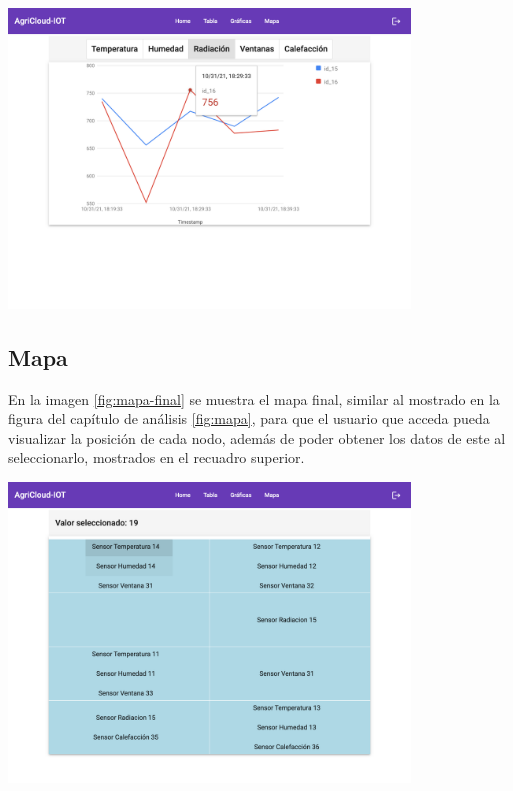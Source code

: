 \begin{center}
    \centering
    \includegraphics[width=0.8\textwidth]{img/06-Web-charts.png}
    \label{fig:graphs-final}
\end{center}


\subsection{Mapa}

En la imagen \ref{fig:mapa-final} se muestra el mapa final, similar al mostrado en la figura del capítulo de análisis \ref{fig:mapa}, para que el usuario que acceda pueda visualizar la posición de cada nodo, además de poder obtener los datos de este al seleccionarlo, mostrados en el recuadro superior.

\begin{center}
    \centering
    \includegraphics[width=0.8\textwidth]{img/06-Web-map.png}
    \label{fig:mapa-final}
\end{center}

